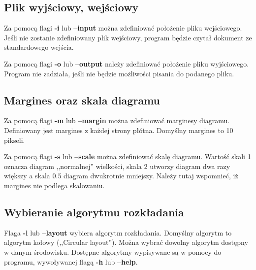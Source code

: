 \subsection{Plik wyjściowy, wejściowy}
Za pomocą flagi \textbf{-i} lub \textbf{--input} można zdefiniować położenie pliku wejściowego. Jeśli nie zostanie zdefiniowany plik wejściowy, program będzie czytał dokument ze standardowego wejścia.

Za pomocą flagi \textbf{-o} lub \textbf{--output} należy zdefiniować położenie pliku wyjściowego. Program nie zadziała, jeśli nie będzie możliwości pisania do podanego pliku.

\subsection{Margines oraz skala diagramu}
Za pomocą flagi \textbf{-m} lub \textbf{--margin} można zdefiniować marginesy diagramu. Definiowany jest margines z każdej strony płótna. Domyślny margines to 10 pikseli.

Za pomocą flagi \textbf{-s} lub \textbf{--scale} można zdefiniować skalę diagramu. Wartość skali 1 oznacza diagram ,,normalnej'' wielkości, skala 2 utworzy diagram dwa razy większy a skala 0.5 diagram dwukrotnie mniejszy. Należy tutaj wspomnieć, iż margines nie podlega skalowaniu.

\subsection{Wybieranie algorytmu rozkładania}
Flaga \textbf{-l} lub \textbf{--layout} wybiera algorytm rozkładania. Domyślny algorytm to algorytm kołowy (,,Circular layout''). Można wybrać dowolny algorytm dostępny w danym środowisku. Dostępne algorytmy wypisywane są w pomocy do programu, wywoływanej flagą \textbf{-h} lub \textbf{--help}.